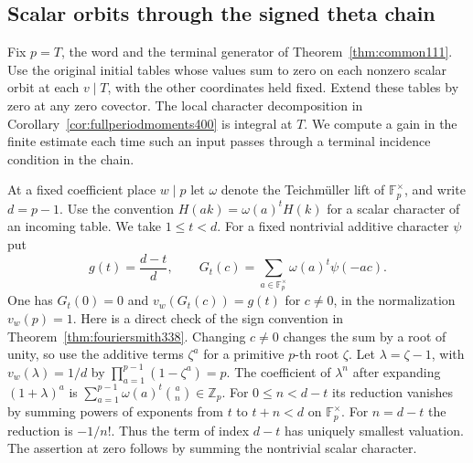 \documentclass[a4paper,11pt]{article}
\theoremstyle{definition}
\theoremstyle{remark}
\numberwithin{equation}{section}
\begin{document}
\subsection{Scalar orbits through the signed theta chain}
\label{sec:scalarchain501}

Fix \(p=T\), the word and the terminal generator of
Theorem~\ref{thm:common111}. Use the original initial tables
whose values sum to zero on each nonzero scalar orbit at each
\(v\mid T\), with the other coordinates held fixed. Extend these
tables by zero at any zero covector. The local character
decomposition in Corollary~\ref{cor:fullperiodmoments400}
is integral at \(T\). We compute a gain in the finite estimate
each time such an input passes through a terminal incidence
condition in the chain.

At a fixed coefficient place \(w\mid p\) let \(\omega\) denote
the Teichm\"uller lift of \(\mathbb F_p^\times\), and write
\(d=p-1\). Use the convention \(H(a k)=\omega(a)^t H(k)\) for
a scalar character of an incoming table. We take \(1\le t<d\).
For a fixed nontrivial additive character \(\psi\) put
\[
 g(t)=\frac{d-t}{d},\qquad
 G_t(c)=\sum_{a\in\mathbb F_p^\times}\omega(a)^t\psi(-ac).
\]
One has \(G_t(0)=0\) and \(v_w(G_t(c))=g(t)\) for \(c\ne0\),
in the normalization \(v_w(p)=1\). Here is a direct check of
the sign convention in Theorem~\ref{thm:fouriersmith338}.
Changing \(c\ne0\) changes the sum by a root of unity, so use
the additive terms \(\zeta^a\) for a primitive \(p\)-th root
\(\zeta\). Let \(\lambda=\zeta-1\), with \(v_w(\lambda)=1/d\)
by \(\prod_{a=1}^{p-1}(1-\zeta^a)=p\). The coefficient of
\(\lambda^n\) after expanding \((1+\lambda)^a\) is
\(\sum_{a=1}^{p-1}\omega(a)^t\binom{a}{n}\in\mathbb Z_p\).
For \(0\le n<d-t\) its reduction vanishes by summing powers
of exponents from \(t\) to \(t+n<d\) on \(\mathbb F_p^\times\).
For \(n=d-t\) the reduction is \(-1/n!\). Thus the term of
index \(d-t\) has uniquely smallest valuation. The assertion
at zero follows by summing the nontrivial scalar character.
\end{document}
